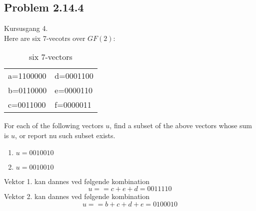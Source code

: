 \subsection{Problem 2.14.4}
Kursusgang 4.\\
Here are six 7-vecotrs over $GF(2)$:
\begin{table}[h]
    \centering
    \begin{tabular}{|l|l|}
        \hline
        a=1100000&d=0001100\\
        b=0110000&e=0000110\\
        c=0011000&f=0000011\\\hline
    \end{tabular}
    \label{tab:fields}
    \caption{six 7-vectors}
\end{table}
For each of the following vectors $u$, find a subset of the above vectors whose sum is $u$, or report nu such subset exists.
\begin{enumerate}
    \item $u=0010010$
    \item $u=0010010$
\end{enumerate}
Vektor 1. kan dannes ved følgende kombination
\begin{equation}
    u==c+e+d=0011110
\end{equation}
Vektor 2. kan dannes ved følgende kombination
\begin{equation}
    u==b+c+d+e=0100010
\end{equation}